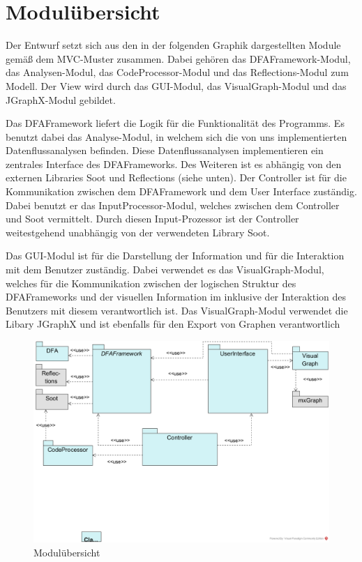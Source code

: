 \section{Modulübersicht}
Der Entwurf setzt sich aus den in der folgenden Graphik dargestellten Module gemäß dem MVC-Muster zusammen.
Dabei gehören das DFAFramework-Modul, das Analysen-Modul, das CodeProcessor-Modul und das Reflections-Modul zum Modell. 
Der View wird durch das GUI-Modul, das VisualGraph-Modul und das JGraphX-Modul gebildet. \par
Das DFAFramework liefert die Logik für die Funktionalität des Programms. 
Es benutzt dabei das Analyse-Modul, in welchem sich die von uns implementierten Datenflussanalysen befinden. 
Diese Datenflussanalysen implementieren ein zentrales Interface des DFAFrameworks. 
Des Weiteren ist es abhängig von den externen Libraries Soot und Reflections (siehe unten). 
Der Controller ist für die Kommunikation zwischen dem DFAFramework und dem User Interface zuständig. 
Dabei benutzt er das InputProcessor-Modul, welches zwischen dem Controller und Soot vermittelt. 
Durch diesen Input-Prozessor ist der Controller weitestgehend unabhängig von der verwendeten Library Soot. \par 
Das GUI-Modul ist für die Darstellung der Information und für die Interaktion mit dem Benutzer zuständig. 
Dabei verwendet es das VisualGraph-Modul, welches für die Kommunikation zwischen der logischen Struktur des DFAFrameworks und der visuellen Information im  inklusive der Interaktion des Benutzers mit diesem verantwortlich ist. 
Das VisualGraph-Modul verwendet die Libary JGraphX und ist ebenfalls für den Export von Graphen verantwortlich

\begin{figure}[htbp] 
  \centering
     \includegraphics[width=1\textwidth]{Entwurfsentscheidungen/PackageOverview}
  \caption{Modulübersicht}
  \label{fig:Ubersicht}
\end{figure}

